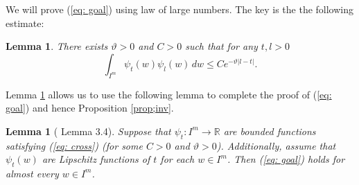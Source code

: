 \documentclass[12pt]{amsart}
\newtheorem{lem}[thm]{Lemma}
\theoremstyle{definition}
\theoremstyle{remark}
\numberwithin{equation}{section}
\begin{document}
We will prove (\ref{eq: goal}) using  law of large numbers. The key is the the 
following estimate: 
\begin{lem}\label{lem;decay}
There exists $\vartheta>0$ and $C>0$ such that for any $t,l>0$
\begin{equation}\label{eq: cross}
\int_{I^m}\psi_t(w)\psi_l(w)\,dw\le C e^{-\vartheta |l-t|}.
\end{equation}
\end{lem}

Lemma \ref{lem;decay} allows us to use the following lemma  to complete the proof of 
 (\ref{eq: goal}) and hence Proposition \ref{prop;inv}.

\begin{lem}[\cite{ce} Lemma 3.4]
Suppose that $\psi_t:I^m\to \mathbb R$ are bounded functions satisfying (\ref{eq: cross}) (for some $C>0$ and $\vartheta>0$).  Additionally, assume that $\psi_t(w)$ are Lipschitz functions of $t$ for each $w\in I^m$. Then
 (\ref{eq: goal}) holds
 for almost 
every $w\in I^m$.
\end{lem}
\end{document}
